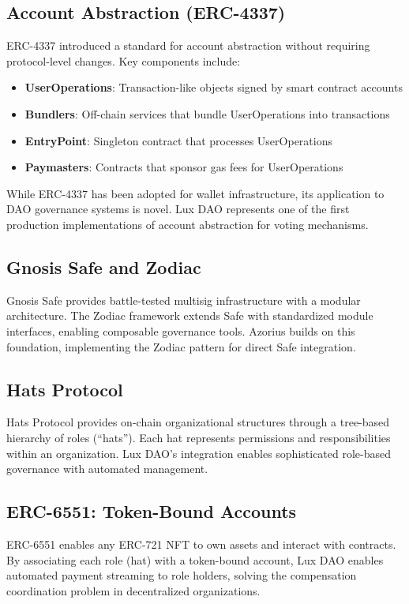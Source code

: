 \subsection{Account Abstraction (ERC-4337)}

ERC-4337 \cite{erc4337} introduced a standard for account abstraction without requiring protocol-level changes. Key components include:

\begin{itemize}
    \item \textbf{UserOperations}: Transaction-like objects signed by smart contract accounts
    \item \textbf{Bundlers}: Off-chain services that bundle UserOperations into transactions
    \item \textbf{EntryPoint}: Singleton contract that processes UserOperations
    \item \textbf{Paymasters}: Contracts that sponsor gas fees for UserOperations
\end{itemize}

While ERC-4337 has been adopted for wallet infrastructure, its application to DAO governance systems is novel. Lux DAO represents one of the first production implementations of account abstraction for voting mechanisms.

\subsection{Gnosis Safe and Zodiac}

Gnosis Safe \cite{safe} provides battle-tested multisig infrastructure with a modular architecture. The Zodiac framework \cite{zodiac} extends Safe with standardized module interfaces, enabling composable governance tools. Azorius builds on this foundation, implementing the Zodiac pattern for direct Safe integration.

\subsection{Hats Protocol}

Hats Protocol \cite{hats} provides on-chain organizational structures through a tree-based hierarchy of roles (``hats''). Each hat represents permissions and responsibilities within an organization. Lux DAO's integration enables sophisticated role-based governance with automated management.

\subsection{ERC-6551: Token-Bound Accounts}

ERC-6551 \cite{erc6551} enables any ERC-721 NFT to own assets and interact with contracts. By associating each role (hat) with a token-bound account, Lux DAO enables automated payment streaming to role holders, solving the compensation coordination problem in decentralized organizations.

